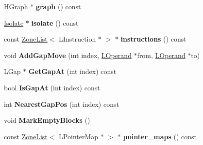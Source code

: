 \begin{DoxyCompactItemize}
\item 
\hypertarget{classv8_1_1internal_1_1_l_chunk_ae8674654339884a937f946368fc8e857}{}H\+Graph $\ast$ {\bfseries graph} () const \label{classv8_1_1internal_1_1_l_chunk_ae8674654339884a937f946368fc8e857}

\item 
\hypertarget{classv8_1_1internal_1_1_l_chunk_ab193d1964b055f425c9d8fe027cfa9c4}{}\hyperlink{classv8_1_1internal_1_1_isolate}{Isolate} $\ast$ {\bfseries isolate} () const \label{classv8_1_1internal_1_1_l_chunk_ab193d1964b055f425c9d8fe027cfa9c4}

\item 
\hypertarget{classv8_1_1internal_1_1_l_chunk_ac961c57b99959c05913e423b1981538b}{}const \hyperlink{classv8_1_1internal_1_1_zone_list}{Zone\+List}$<$ L\+Instruction $\ast$ $>$ $\ast$ {\bfseries instructions} () const \label{classv8_1_1internal_1_1_l_chunk_ac961c57b99959c05913e423b1981538b}

\item 
\hypertarget{classv8_1_1internal_1_1_l_chunk_a72ba50bf248b10c56901b11f84b9aad4}{}void {\bfseries Add\+Gap\+Move} (int index, \hyperlink{classv8_1_1internal_1_1_l_operand}{L\+Operand} $\ast$from, \hyperlink{classv8_1_1internal_1_1_l_operand}{L\+Operand} $\ast$to)\label{classv8_1_1internal_1_1_l_chunk_a72ba50bf248b10c56901b11f84b9aad4}

\item 
\hypertarget{classv8_1_1internal_1_1_l_chunk_ae9bc08f7558ac509895967f50c0697f3}{}L\+Gap $\ast$ {\bfseries Get\+Gap\+At} (int index) const \label{classv8_1_1internal_1_1_l_chunk_ae9bc08f7558ac509895967f50c0697f3}

\item 
\hypertarget{classv8_1_1internal_1_1_l_chunk_a2ae7ddcd72ac3437877090e22c1c1091}{}bool {\bfseries Is\+Gap\+At} (int index) const \label{classv8_1_1internal_1_1_l_chunk_a2ae7ddcd72ac3437877090e22c1c1091}

\item 
\hypertarget{classv8_1_1internal_1_1_l_chunk_ac5d9348d24f2b528a49ba23c05097b1d}{}int {\bfseries Nearest\+Gap\+Pos} (int index) const \label{classv8_1_1internal_1_1_l_chunk_ac5d9348d24f2b528a49ba23c05097b1d}

\item 
\hypertarget{classv8_1_1internal_1_1_l_chunk_a2ac3d03a7d2a00d21641da256a94f4b3}{}void {\bfseries Mark\+Empty\+Blocks} ()\label{classv8_1_1internal_1_1_l_chunk_a2ac3d03a7d2a00d21641da256a94f4b3}

\item 
\hypertarget{classv8_1_1internal_1_1_l_chunk_a0e2745acc31d2df4290fff8fa433920c}{}const \hyperlink{classv8_1_1internal_1_1_zone_list}{Zone\+List}$<$ L\+Pointer\+Map $\ast$ $>$ $\ast$ {\bfseries pointer\+\_\+maps} () const \label{classv8_1_1internal_1_1_l_chunk_a0e2745acc31d2df4290fff8fa433920c}


\end{DoxyCompactItemize}
